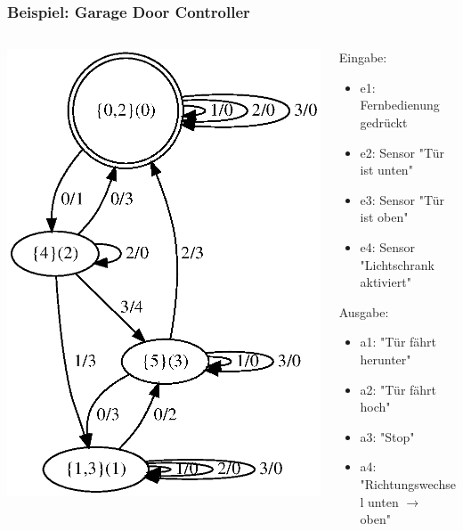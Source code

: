 \documentclass[10pt]{beamer}
\begin{document}
\begin{frame}
\frametitle{Beispiel: Garage Door Controller}
\begin{columns}[T] %
\begin{column}{.55\textwidth}

\includegraphics[width=\textwidth]{images/gdc_min}
\end{column}%
\hfill%
\begin{column}{.55\textwidth}
Eingabe:
\begin{itemize}
  \item e1: Fernbedienung gedrückt
  \item e2: Sensor "Tür ist unten"
  \item e3: Sensor "Tür ist oben"
  \item e4: Sensor "Lichtschrank aktiviert"
\end{itemize}
Ausgabe:
\begin{itemize}
  \item a1: "Tür fährt herunter"
  \item a2: "Tür fährt hoch"
  \item a3: "Stop"
  \item a4: "Richtungswechsel unten $\rightarrow$ oben"
\end{itemize}
\end{column}%
\end{columns}
\end{frame}
\end{document}
